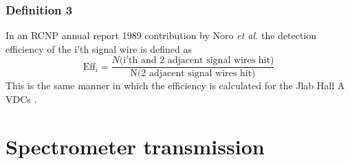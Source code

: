 \documentclass[11pt]{report}
\begin{document}
\subsubsection{Definition 3}
In an RCNP annual report 1989 contribution by Noro {\it et al.} the detection efficiency of the i'th
signal wire is defined as 
\begin{equation} 
\textrm{Eff}_{i} = \frac{N(\textrm{i'th and 2 adjacent signal wires hit)}}{\textrm{N(2 adjacent signal wires hit)}}
\end{equation} 
This is the same manner in which the efficiency is calculated for the Jlab Hall A VDCs \cite{Fis01}.
















\section{Spectrometer transmission}\label{sec:Spectrometer_transmission}
\end{document}
